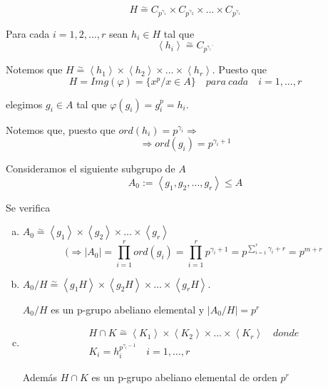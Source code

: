 \documentclass{article}
\begin{document}
\begin{equation*}
H\overset{\sim}{=} C_{p^{\gamma_1}}\times C_{p^{\gamma_2}}\times \ldots \times C_{p^{\gamma_r}}
\end{equation*}

Para cada $i=1,2,\ldots,r$ sean $h_i\in H$ tal que
\begin{equation*}
\left\langle h_i\right\rangle\overset{\sim}{=}C_{p^{\gamma_i´}}
\end{equation*}

Notemos que $H\overset{\sim}{=}\left\langle h_1\right\rangle\times \left\langle h_2\right\rangle \times \ldots \times \left\langle h_r\right\rangle$. Puesto que 
\begin{equation*}
H=Img(\varphi)=\{x^p/x\in A\}\quad para\:cada\quad i=1,\ldots,r
\end{equation*}

elegimos $g_i\in A$ tal que $\varphi(g_i)=g_i^p=h_i$.

Notemos que, puesto que $ord(h_i)=p^{\gamma_i}\Rightarrow$
\begin{equation*}
\Rightarrow ord(g_i)=p^{\gamma_i+1}
\end{equation*}

Consideramos el siguiente subgrupo de $A$
\begin{equation*}
A_0:=\left\langle g_1,g_2,\ldots,g_r\right\rangle \leq A
\end{equation*}

Se verifica
\begin{enumerate}[(a)]
\item $A_0\overset{\sim}{=} \left\langle g_1\right\rangle \times \left\langle g_2\right\rangle \times \ldots \times \left\langle g_r\right\rangle$
\begin{equation*}
(\Rightarrow |A_0|=\prod_{i=1}^r ord(g_i)=\prod_{i=1}^r p^{\gamma_i+1}=p^{\sum_{i=1}^r \gamma_i+r}=p^{m+r}
\end{equation*}

\item $A_0/H\overset{\sim}{=}\left\langle g_1H\right\rangle \times \left\langle g_2H\right\rangle \times \ldots \times \left\langle g_rH\right\rangle$.

$A_0/H$ es un p-grupo abeliano elemental y $|A_0/H|=p^r$

\item \begin{gather*}
H\cap K\overset{\sim}{=}\left\langle K_1\right\rangle\times \left\langle K_2\right\rangle \times \ldots\times \left\langle K_r\right\rangle\quad donde\\
K_i=h_i^{p^{\gamma_i-1}} \quad i=1,\ldots,r
\end{gather*}

Además $H\cap K$ es un p-grupo abeliano elemental de orden $p^r$
\end{enumerate}
\end{document}
